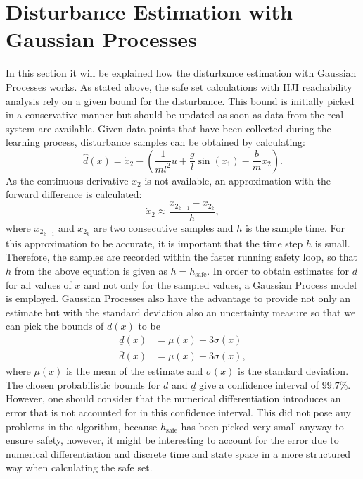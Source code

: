 \documentclass[../main.tex]{subfiles}
\begin{document}
\section{Disturbance Estimation with Gaussian Processes}\label{sec:implementation_GP}
In this section it will be explained how the disturbance estimation with Gaussian Processes works. As stated above, the safe set calculations with HJI reachability analysis rely on a given bound for the disturbance. This bound is initially picked in a conservative manner but should be updated as soon as data from the real system are available. Given data points that have been collected during the learning process, disturbance samples can be obtained by calculating:
\begin{equation}
    \hat{d}(x)=\dot{x}_2-\left(\frac{1}{ml^2}u+\frac{g}{l}\sin(x_1)-\frac{b}{m}x_2\right).
\end{equation}
As the continuous derivative $\dot{x}_2$ is not available, an approximation with the forward difference is calculated:
\begin{equation}
    \dot{x}_2 \approx \frac{x_{2_{k+1}}-x_{2_k}}{h},
\end{equation}
where $x_{2_{k+1}}$ and $x_{2_k}$ are two consecutive samples and $h$ is the sample time.
For this approximation to be accurate, it is important that the time step $h$ is small. Therefore, the samples are recorded within the faster running safety loop, so that $h$ from the above equation is given as $h = h_{\text{safe}}$.
In order to obtain estimates for $d$ for all values of $x$ and not only for the sampled values, a Gaussian Process model is employed. Gaussian Processes also have the advantage to provide not only an estimate but with the standard deviation also an uncertainty measure so that we can pick the bounds of $d(x)$ to be
\begin{align}
    \underline{d}(x) &= \mu(x)-3\sigma(x)\\
    \overline{d}(x) &= \mu(x)+3\sigma(x),
\end{align}
where $\mu(x)$ is the mean of the estimate and $\sigma(x)$ is the standard deviation. The chosen  probabilistic bounds for $\overline{d}$ and $\underline{d}$ give a confidence interval of $99.7\%$. However, one should consider that the numerical differentiation introduces an error that is not accounted for in this confidence interval. This did not pose any problems in the algorithm, because $h_{\text{safe}}$ has been picked very small anyway to ensure safety, however, it might be interesting to account for the error due to numerical differentiation and discrete time and state space in a more structured way when calculating the safe set. \par
\end{document}
